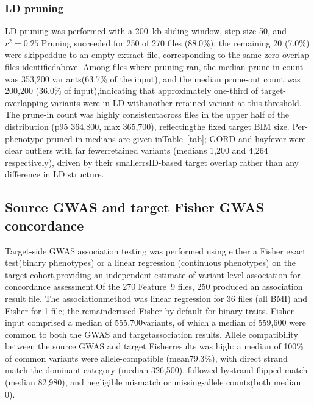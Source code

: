 \documentclass[11pt,a4paper]{article}
\begin{document}
\subsubsection*{LD pruning}

LD pruning was performed with a 200~kb sliding window, step size 50, and $r^{2} = 0.25$.Pruning succeeded for 250 of 270 files (88.0\%); the remaining 20 (7.0\%) were skippeddue to an empty extract file, corresponding to the same zero-overlap files identifiedabove. Among files where pruning ran, the median prune-in count was 353,200 variants(63.7\% of the input), and the median prune-out count was 200,200 (36.0\% of input),indicating that approximately one-third of target-overlapping variants were in LD withanother retained variant at this threshold. The prune-in count was highly consistentacross files in the upper half of the distribution (p95 364,800, max 365,700), reflectingthe fixed target BIM size. Per-phenotype pruned-in medians are given inTable~\ref{tab}; GORD and hayfever were clear outliers with far fewerretained variants (medians 1,200 and 4,264 respectively), driven by their smallerrsID-based target overlap rather than any difference in LD structure.

\subsection{Source GWAS and target Fisher GWAS concordance}

Target-side GWAS association testing was performed using either a Fisher exact test(binary phenotypes) or a linear regression (continuous phenotypes) on the target cohort,providing an independent estimate of variant-level association for concordance assessment.Of the 270 Feature~9 files, 250 produced an association result file. The associationmethod was linear regression for 36 files (all BMI) and Fisher for 1 file; the remainderused Fisher by default for binary traits. Fisher input comprised a median of 555,700variants, of which a median of 559,600 were common to both the GWAS and targetassociation results. Allele compatibility between the source GWAS and target Fisherresults was high: a median of 100\% of common variants were allele-compatible (mean79.3\%), with direct strand match the dominant category (median 326,500), followed bystrand-flipped match (median 82,980), and negligible mismatch or missing-allele counts(both median 0).
\end{document}

